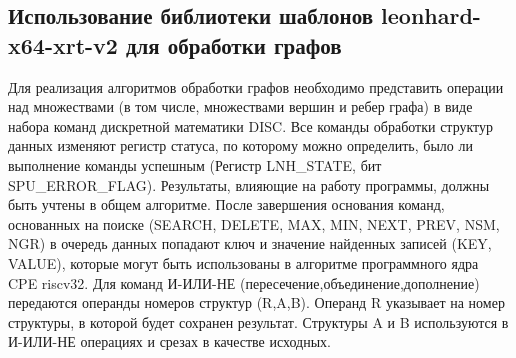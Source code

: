 \subsection{Использование библиотеки шаблонов leonhard-x64-xrt-v2 для обработки графов}
\par Для реализация алгоритмов обработки графов необходимо представить операции над множествами (в том числе, множествами вершин и ребер графа) в виде набора команд дискретной математики DISC. Все команды обработки структур данных изменяют регистр статуса, по которому можно определить, было ли выполнение команды успешным (Регистр LNH\_STATE, бит SPU\_ERROR\_FLAG). Результаты, влияющие на работу программы, должны быть учтены в общем алгоритме. После завершения основания команд, основанных на поиске (SEARCH, DELETE, MAX, MIN, NEXT, PREV, NSM, NGR) в очередь данных попадают ключ и значение найденных записей (KEY, VALUE), которые могут быть использованы в алгоритме программного ядра CPE riscv32. Для команд И-ИЛИ-НЕ (пересечение,объединение,дополнение) передаются операнды номеров структур (R,A,B). Операнд R указывает на номер структуры, в которой будет сохранен результат. Структуры A и B используются в И-ИЛИ-НЕ операциях и срезах в качестве исходных.
\newpage